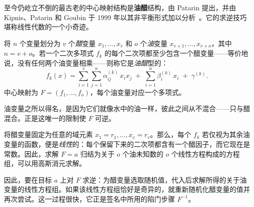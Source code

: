 至今仍屹立不倒的最古老的中心映射结构是\textbf{油醋}结构，由 Patarin 提出，并由 Kipnis、Patarin 和 Goubin 于 1999 年以其非平衡形式加以分析~\cite{kpg1999}。它的求逆技巧堪称线性代数的一个小奇迹。

\begin{definition}[油醋中心映射]
将 $n$ 个变量划分为 $v$ 个\emph{醋}变量 $x_1,\dots,x_v$ 和 $o$ 个\emph{油}变量 $x_{v+1},\dots,x_{v+o}$，其中 $n = v + o$。若一个二次多项式 $f_k$ 的每个二次项都至少包含一个醋变量——等价地说，没有任何两个油变量相乘——则称它是\emph{油醋}型的：
\[
f_k(x) = \sum_{i=1}^{v}\sum_{j=1}^{n} \alpha^{(k)}_{ij}\, x_i x_j
       \;+\; \sum_{i=1}^{n} \beta^{(k)}_i\, x_i \;+\; \gamma^{(k)} .
\]
中心映射为 $F = (f_1,\dots,f_o)$，每个油变量对应一个多项式。
\end{definition}

油变量之所以得名，是因为它们就像水中的油一样，彼此之间从不混合——只与醋混合。正是这唯一的限制使 $F$ 可逆。

\begin{proposition}[通过线性化求逆]
将醋变量固定为任意的域元素 $x_1 = r_1,\dots,x_v = r_v$。那么，每个 $f_k$ 若仅视为其余油变量的函数，便是\emph{线性}的：每个保留下来的二次项都含有一个醋因子，而它现在是常数。因此，求解 $F = a$ 归结为关于 $o$ 个油未知数的 $o$ 个线性方程构成的方程组，可以用高斯消元求解。
\end{proposition}

因此，要在目标 $a$ 上对 $F$ 求逆：为醋变量选取随机值，代入后求解所得的关于油变量的线性方程组。如果该线性方程组恰好是奇异的，就重新随机化醋变量的值并再次尝试。这一过程很快，它正是签名中所用的陷门步骤 $F^{-1}$。

